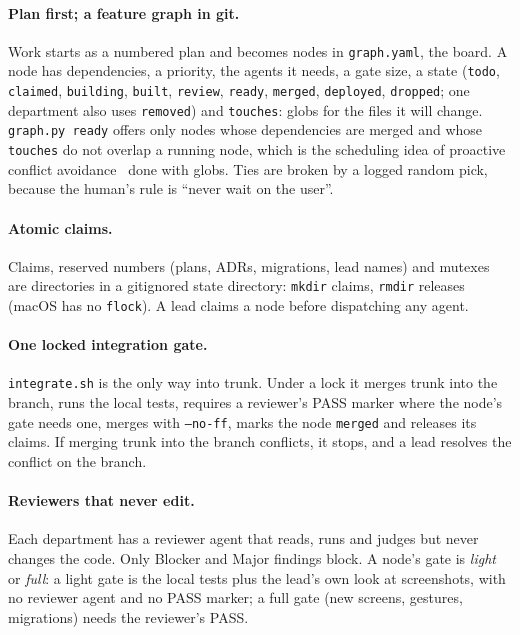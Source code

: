 \documentclass[11pt]{article}
\newcommand{\code}[1]{\texttt{#1}}
\begin{document}
\paragraph{Plan first; a feature graph in git.}
Work starts as a numbered plan and becomes nodes in \code{graph.yaml}, the board. A node
has dependencies, a priority, the agents it needs, a gate size, a state (\code{todo}, %
\code{claimed}, \code{building}, \code{built}, \code{review}, \code{ready},
\code{merged}, \code{deployed}, \code{dropped}; one department also uses
\code{removed}) and \code{touches}: globs for the files it will change.
\code{graph.py ready} offers only nodes whose dependencies are merged and whose
\code{touches} do not overlap a running node, which is the scheduling idea of proactive
conflict avoidance~\citep{kasi2013cassandra} done with globs. Ties are broken by a logged
random pick, because the human's rule is ``never wait on the user''.

\paragraph{Atomic claims.}
Claims, reserved numbers (plans, ADRs, migrations, lead names) and mutexes are
directories in a gitignored state directory: \code{mkdir} claims, \code{rmdir} releases
(macOS has no \code{flock}). A lead claims a node before dispatching any agent.

\paragraph{One locked integration gate.}
\code{integrate.sh} is the only way into trunk. Under a lock it merges trunk into the
branch, runs the local tests, requires a reviewer's PASS marker where the node's gate
needs one, merges with \code{--no-ff}, marks the node \code{merged} and releases its
claims. If merging trunk into the branch conflicts, it stops, and a lead resolves the
conflict on the branch.

\paragraph{Reviewers that never edit.}
Each department has a reviewer agent that reads, runs and judges but never changes the
code. Only Blocker and Major findings block. A node's gate is \emph{light} or \emph{full}: a %
light gate is the local tests plus the lead's own look at screenshots, with no reviewer
agent and no PASS marker; a full gate (new screens, gestures, migrations) needs the
reviewer's PASS.
\end{document}
